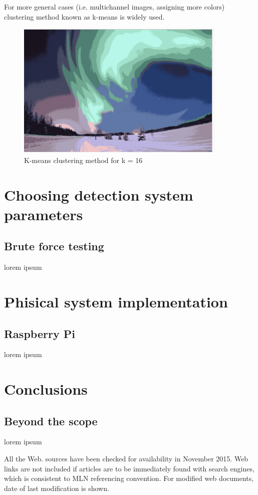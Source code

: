 \documentclass[12pt,twoside,a4paper]{article}
\begin{document}
For more general cases (i.e. multichannel images, assigning more colors) clustering method known as k-means is widely used.\cite{lesscv}
 
\begin{figure}[H]
\centering
\includegraphics[width=0.4\paperwidth]{kmeans}
\caption{K-means clustering method for k = 16\cite{segm}}
\end{figure}

\section{Choosing detection system parameters}
\subsection{Brute force testing}
lorem ipsum
\section{Phisical system implementation}
\subsection{Raspberry Pi}
lorem ipsum
\section{Conclusions}
\subsection{Beyond the scope}
lorem ipsum


All the Web. sources have been checked for availability in November 2015.
Web links are not included if articles are to be immediately found with search engines, which is consistent to MLN referencing convention.
For modified web documents, date of last modification is shown.
\end{document}

